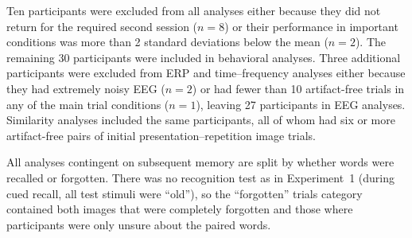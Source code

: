 


Ten participants were excluded from all analyses either because they did not return for the required second session ($n=8$) or their performance in important conditions was more than 2 standard deviations below the mean ($n=2$).  The remaining 30 participants were included in behavioral analyses.
Three additional participants were excluded from ERP and time--frequency analyses either because they had extremely noisy EEG ($n=2$) or had fewer than 10 artifact-free trials in any of the main trial conditions ($n=1$), leaving 27 participants in EEG analyses.  Similarity analyses included the same participants, all of whom had six or more artifact-free pairs of initial presentation--repetition image trials.

All analyses contingent on subsequent memory are split by whether words were recalled or forgotten.  There was no recognition test as in Experiment~1 (during cued recall, all test stimuli were ``old''), so the ``forgotten'' trials category contained both images that were completely forgotten and those where participants were only unsure about the paired words.







